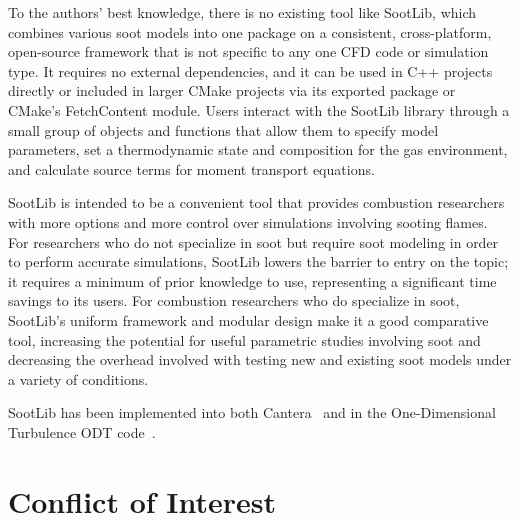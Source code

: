 \documentclass[preprint,letterpaper]{elsarticle}
\begin{document}
To the authors' best knowledge, there is no existing tool like SootLib, which combines various soot models into one package on a consistent, cross-platform, open-source framework that is not specific to any one CFD code or simulation type. It requires no external dependencies, and it can be used in C++ projects directly or included in larger CMake projects via its exported package or CMake's FetchContent module. Users interact with the SootLib library through a small group of objects and functions that allow them to specify model parameters, set a thermodynamic state and composition for the gas environment, and calculate source terms for moment transport equations.

SootLib is intended to be a convenient tool that provides combustion researchers with more options and more control over simulations involving sooting flames. For researchers who do not specialize in soot but require soot modeling in order to perform accurate simulations, SootLib lowers the barrier to entry on the topic; it requires a minimum of prior knowledge to use, representing a significant time savings to its users. For combustion researchers who do specialize in soot, SootLib's uniform framework and modular design make it a good comparative tool, increasing the potential for useful parametric studies involving soot and decreasing the overhead involved with testing new and existing soot models under a variety of conditions.

SootLib has been implemented into both Cantera~\cite{Cantera} and in the One-Dimensional Turbulence ODT code~\cite{Stephens_2021}. 




\section{Conflict of Interest}
\end{document}
